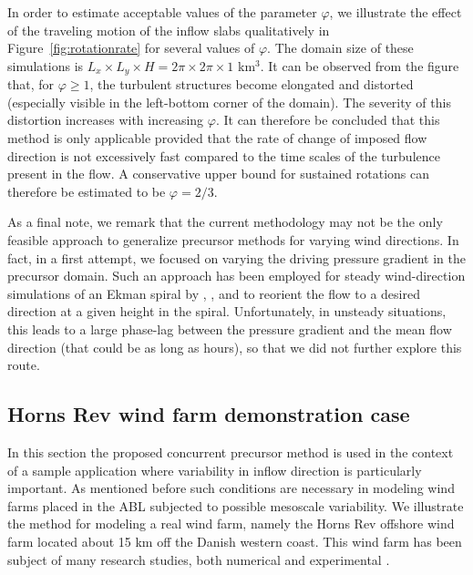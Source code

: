 	In order to estimate acceptable values of the parameter $\varphi$, we illustrate the effect of the traveling motion of the inflow slabs
	qualitatively in Figure~\ref{fig:rotationrate} for several values of $\varphi$. The domain size of these simulations is $L_x \times L_y \times H
	= 2\pi \times 2\pi \times 1$ km$^3$. It can be observed from the figure that, for $\varphi \geq 1$, the turbulent structures become elongated
	and distorted (especially visible in the left-bottom corner of the domain). The severity of this distortion increases with increasing $\varphi$. It can therefore be concluded that this method is only applicable provided that the rate of change of imposed flow direction is not excessively fast compared to the time scales of the turbulence present in the flow. A conservative upper bound for sustained rotations can therefore be estimated to be $\varphi = 2/3$.
	
	As a final note, we remark that the current methodology may not be the only feasible approach to generalize precursor methods for varying wind
	directions. In fact, in a first attempt, we focused on varying the driving pressure gradient in the precursor domain. Such an approach has
	been employed for steady wind-direction simulations of an Ekman spiral by \cite{goit2013effect}, \cite{sescu2014control}, and \cite{allaerts2015large} to reorient the flow to a desired direction at a given height in the spiral. Unfortunately, in unsteady situations, this leads to a large phase-lag between the pressure gradient and the mean flow direction (that could be as long as hours), so that we did not further explore this route.

	\subsection{Horns Rev wind farm demonstration case}\label{subsec:timevaryingHR}
		
		In this section the proposed  concurrent precursor method is used in the context of a sample application where variability in inflow direction is particularly important. As mentioned before such conditions are necessary in modeling wind farms placed in the ABL subjected to possible mesoscale variability. We illustrate the method for modeling a real wind farm, namely the Horns Rev offshore wind farm located about 15 km off the Danish western coast. This wind farm has been subject of many research studies, both numerical and experimental  \cite[see, e.g.,][]{barthelmie2007modelling, pena2012atmospheric, hansen2012impact, porte2013numerical}.
		
